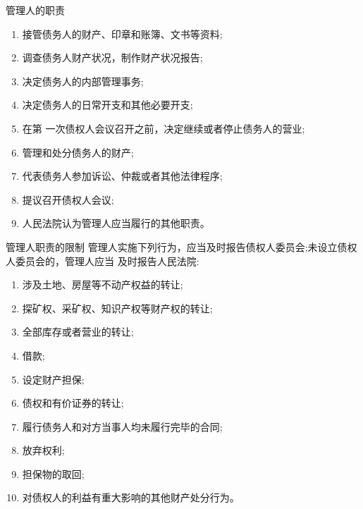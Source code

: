\documentclass[UTF8,12pt]{ctexart}
\numberwithin{equation}{section} %
\numberwithin{figure}{section}
\numberwithin{table}{section}
\begin{document}
	管理人的职责
	\begin{enumerate}
		\item 接管债务人的财产、印章和账簿、文书等资料;
		
		\item 调查债务人财产状况，制作财产状况报告;
		
		\item 决定债务人的内部管理事务;
		
		\item 决定债务人的日常开支和其他必要开支;
		
		\item 在第 一次债权人会议召开之前，决定继续或者停止债务人的营业;
		
		\item 管理和处分债务人的财产;
		
		\item 代表债务人参加诉讼、仲裁或者其他法律程序;
		
		\item 提议召开债权人会议;
		
		\item 人民法院认为管理人应当履行的其他职责。
	\end{enumerate}
	
	管理人职责的限制 管理人实施下列行为，应当及时报告债权人委员会;未设立债权人委员会的，管理人应当 及时报告人民法院:
	\begin{enumerate}
		\item 涉及土地、房屋等不动产权益的转让;
		
		\item 探矿权、采矿权、知识产权等财产权的转让;
		
		\item 全部库存或者营业的转让;
		
		\item 借款;
		
		\item 设定财产担保;
		
		\item 债权和有价证券的转让;
		
		\item 履行债务人和对方当事人均未履行完毕的合同;
		
		\item 放弃权利;
		
		\item 担保物的取回;
		
		\item 对债权人的利益有重大影响的其他财产处分行为。
	\end{enumerate}
	
\end{document}
